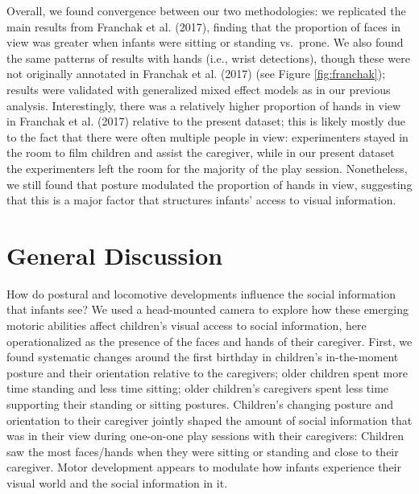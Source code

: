 \documentclass[english,man,floatsintext]{apa6}
\begin{document}
Overall, we found convergence between our two methodologies: we
replicated the main results from Franchak et al. (2017), finding that
the proportion of faces in view was greater when infants were sitting or
standing vs.~prone. We also found the same patterns of results with
hands (i.e., wrist detections), though these were not originally
annotated in Franchak et al. (2017) (see Figure \ref{fig:franchak});
results were validated with generalized mixed effect models as in our
previous analysis. Interestingly, there was a relatively higher
proportion of hands in view in Franchak et al. (2017) relative to the
present dataset; this is likely mostly due to the fact that there were
often multiple people in view: experimenters stayed in the room to film
children and assist the caregiver, while in our present dataset the
experimenters left the room for the majority of the play session.
Nonetheless, we still found that posture modulated the proportion of
hands in view, suggesting that this is a major factor that structures
infants' access to visual information.

\section{General Discussion}\label{general-discussion}

How do postural and locomotive developments influence the social
information that infants see? We used a head-mounted camera to explore
how these emerging motoric abilities affect children's visual access to
social information, here operationalized as the presence of the faces
and hands of their caregiver. First, we found systematic changes around
the first birthday in children's in-the-moment posture and their
orientation relative to the caregivers; older children spent more time
standing and less time sitting; older children's caregivers spent less
time supporting their standing or sitting postures. Children's changing
posture and orientation to their caregiver jointly shaped the amount of
social information that was in their view during one-on-one play
sessions with their caregivers: Children saw the most faces/hands when
they were sitting or standing and close to their caregiver. Motor
development appears to modulate how infants experience their visual
world and the social information in it.
\end{document}
